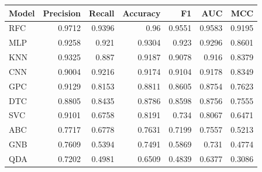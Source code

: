\begin{tabular}{lrrrrrr}
\toprule
Model & Precision & Recall & Accuracy & F1 & AUC & MCC \\
\midrule
RFC & 0.9712 & 0.9396 & 0.96 & 0.9551 & 0.9583 & 0.9195 \\
MLP & 0.9258 & 0.921 & 0.9304 & 0.923 & 0.9296 & 0.8601 \\
KNN & 0.9325 & 0.887 & 0.9187 & 0.9078 & 0.916 & 0.8379 \\
CNN & 0.9004 & 0.9216 & 0.9174 & 0.9104 & 0.9178 & 0.8349 \\
GPC & 0.9129 & 0.8153 & 0.8811 & 0.8605 & 0.8754 & 0.7623 \\
DTC & 0.8805 & 0.8435 & 0.8786 & 0.8598 & 0.8756 & 0.7555 \\
SVC & 0.9101 & 0.6758 & 0.8191 & 0.734 & 0.8067 & 0.6471 \\
ABC & 0.7717 & 0.6778 & 0.7631 & 0.7199 & 0.7557 & 0.5213 \\
GNB & 0.7609 & 0.5394 & 0.7491 & 0.5869 & 0.731 & 0.4774 \\
QDA & 0.7202 & 0.4981 & 0.6509 & 0.4839 & 0.6377 & 0.3086 \\
\bottomrule
\end{tabular}
